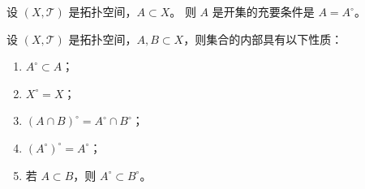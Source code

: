 \begin{corollary}[自己等于自己的内部是开集的充要条件]
设 $(X,\mathcal{T})$ 是拓扑空间，$A\subset X$。  
则 $A$ 是开集的充要条件是 $A=A^{\circ}$。
\end{corollary}

\begin{theorem}[内部的性质]
设 $(X,\mathcal{T})$ 是拓扑空间，$A,B\subset X$，则集合的内部具有以下性质：
\begin{enumerate}[(1)]
  \item $A^{\circ}\subset A$；
  \item $X^{\circ}=X$；
  \item $(A\cap B)^{\circ}=A^{\circ}\cap B^{\circ}$；
  \item $(A^{\circ})^{\circ}=A^{\circ}$；
  \item 若 $A\subset B$，则 $A^{\circ}\subset B^{\circ}$。
\end{enumerate}
\end{theorem}
